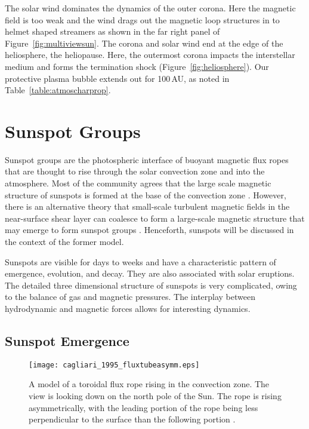
The solar wind dominates the dynamics of the outer corona. Here the magnetic field is too weak and the wind drags out the magnetic loop structures in to helmet shaped streamers as shown in the far right panel of Figure~\ref{fig:multiviewsun}. The corona and solar wind end at the edge of the heliosphere, the heliopause. Here, the outermost corona impacts the interstellar medium and forms the termination shock (Figure~\ref{fig:heliosphere}). Our protective plasma bubble extends out for 100\,AU, as noted in Table~\ref{table:atmoscharprop}.


\section{Sunspot Groups}\label{intro:aremerge}

Sunspot groups are the photospheric interface of buoyant magnetic flux ropes that are thought to rise through the solar convection zone and into the atmosphere. Most of the community agrees that the large scale magnetic structure of sunspots is formed at the base of the convection zone \citep{Spiegel:1980}. However, there is an alternative theory that small-scale turbulent magnetic fields in the near-surface shear layer can coalesce to form a large-scale magnetic structure that may emerge to form sunspot groups \citep{Brandenburg:2005}. Henceforth, sunspots will be discussed in the context of the former model. 

Sunspots are visible for days to weeks and have a characteristic pattern of emergence, evolution, and decay. They are also associated with solar eruptions. The detailed three dimensional structure of sunspots is very complicated, owing to the balance of gas and magnetic pressures. The interplay between hydrodynamic and magnetic forces allows for interesting dynamics.


\subsection{Sunspot Emergence}

\begin{figure}[t]
\centerline{\texttt{[image: cagliari\_1995\_fluxtubeasymm.eps]}}
\caption[A model of a toroidal flux rope rising in the convection zone.]{A model of a toroidal flux rope rising in the convection zone.  The view is looking down on the north pole of the Sun. The rope is rising asymmetrically, with the leading portion of the rope being less perpendicular to the surface than the following portion \citep[from:][]{Caligari:1995}.}
\label{fig:buoyantfluxtube}
\end{figure}

